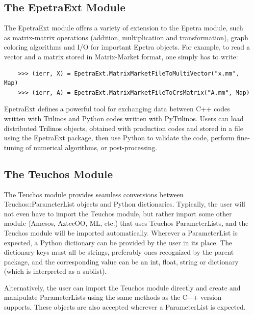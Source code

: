 \documentclass[acmtocl]{acmtrans2m}
\newcommand{\PyTrilinos}{{PyTrilinos}}
\begin{document}
\subsection{The EpetraExt Module}
\label{subsec:epetraext}

The EpetraExt module offers a variety of extension to the Epetra
module, such as matrix-matrix operations (addition, multiplication and
transformation), graph coloring algorithms and I/O for important
Epetra objects.  For example, to read a vector and a matrix stored in
Matrix-Market format, one simply has to write:
\begin{verbatim}
    >>> (ierr, X) = EpetraExt.MatrixMarketFileToMultiVector("x.mm", Map)
    >>> (ierr, A) = EpetraExt.MatrixMarketFileToCrsMatrix("A.mm", Map)
\end{verbatim}
EpetraExt defines a powerful tool for exchanging data between C++
codes written with Trilinos and Python codes written with \PyTrilinos.
Users can load distributed Trilinos objects, obtained with production
codes and stored in a file using the EpetraExt package, then use
Python to validate the code, perform fine-tuning of numerical
algorithms, or post-processing.

\subsection{The Teuchos Module}
\label{subsec:teuchos}

The Teuchos module provides seamless conversions between
Teuchos::ParameterList objects and Python dictionaries.  Typically,
the user will not even have to import the Teuchos module, but rather
import some other module (Amesos, AztecOO, ML, etc.) that uses Teuchos
ParameterLists, and the Teuchos module will be imported automatically.
Wherever a ParameterList is expected, a Python dictionary can be
provided by the user in its place.  The dictionary keys must all be
strings, preferably ones recognized by the parent package, and the
corresponding value can be an int, float, string or dictionary (which
is interpreted as a sublist).

Alternatively, the user can import the Teuchos module directly and
create and manipulate ParameterLists using the same methods as the C++
version supports.  These objects are also accepted wherever a
ParameterList is expected.
\end{document}
